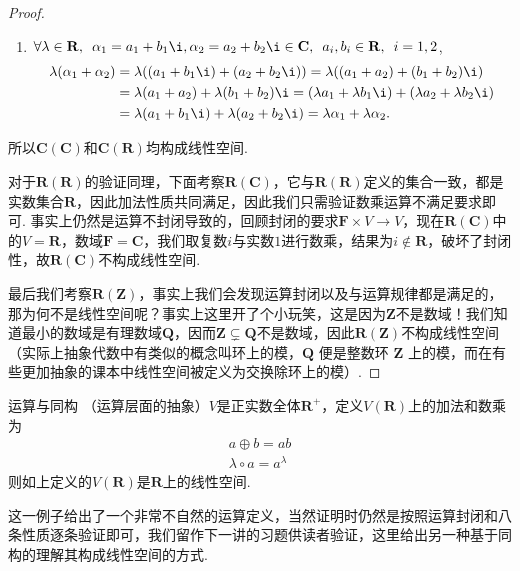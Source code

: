 \begin{proof}
\begin{enumerate}
        \item $\forall \lambda \in \mathbf{R},\enspace \alpha_1 = a_1+b_1\i, \alpha_2 = a_2+b_2\i \in \mathbf{C},\enspace a_i, b_i \in \mathbf{R},\enspace i = 1, 2$,
              \begin{align*}
                  \lambda(\alpha_1+\alpha_2)
                   & = \lambda((a_1+b_1\i)+(a_2+b_2\i)) = \lambda((a_1+a_2)+(b_1+b_2)\i)                             \\
                   & = \lambda(a_1+a_2)+\lambda(b_1+b_2)\i = (\lambda a_1+\lambda b_1\i)+(\lambda a_2+\lambda b_2\i) \\
                   & = \lambda(a_1+b_1\i)+\lambda(a_2+b_2\i) = \lambda \alpha_1 + \lambda \alpha_2.
              \end{align*}
    \end{enumerate}
    所以$\mathbf{C}(\mathbf{C})$和$\mathbf{C}(\mathbf{R})$均构成线性空间.

    对于$\mathbf{R(R)}$的验证同理，下面考察$\mathbf{R}(\mathbf{C})$，它与$\mathbf{R(R)}$定义的集合一致，都是实数集合$\mathbf{R}$，因此加法性质共同满足，因此我们只需验证数乘运算不满足要求即可. 事实上仍然是运算不封闭导致的，回顾封闭的要求$\mathbf{F}\times V\to V$，现在$\mathbf{R(C)}$中的$V=\mathbf{R}$，数域$\mathbf{F}=\mathbf{C}$，我们取复数$i$与实数$1$进行数乘，结果为$i\notin\mathbf{R}$，破坏了封闭性，故$\mathbf{R(C)}$不构成线性空间.

    最后我们考察$\mathbf{R(Z)}$，事实上我们会发现运算封闭以及与运算规律都是满足的，那为何不是线性空间呢？事实上这里开了个小玩笑，这是因为$\mathbf{Z}$不是数域！我们知道最小的数域是有理数域$\mathbf{Q}$，因而$\mathbf{Z}\subsetneq\mathbf{Q}$不是数域，因此$\mathbf{R(Z)}$不构成线性空间（实际上抽象代数中有类似的概念叫环上的模，$\mathbf{Q}$ 便是整数环 $\mathbf{Z}$ 上的模，而在有些更加抽象的课本中线性空间被定义为交换除环上的模）.
\end{proof}

\begin{example}{}{运算与同构}
    （运算层面的抽象）$V$是正实数全体$\mathbf{R}^+$，定义$V(\mathbf{R})$上的加法和数乘为
    \begin{gather*}
        a\oplus b=ab \\
        \lambda\circ a=a^\lambda
    \end{gather*}
    则如上定义的$V(\mathbf{R})$是$\mathbf{R}$上的线性空间.
\end{example}

这一例子给出了一个非常不自然的运算定义，当然证明时仍然是按照运算封闭和八条性质逐条验证即可，我们留作下一讲的习题供读者验证，这里给出另一种基于同构的理解其构成线性空间的方式.

